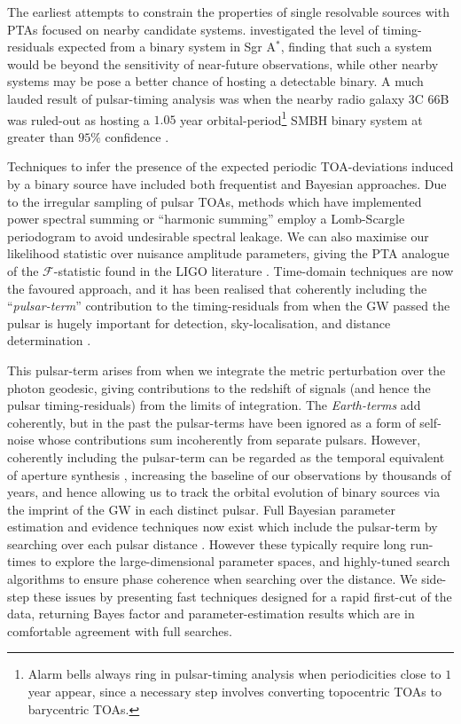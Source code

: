 \documentclass[twocolappendix,tighten]{emulateapj}
\begin{document}
The earliest attempts to constrain the properties of single resolvable sources with PTAs focused on nearby candidate systems. \citet{lommenbacker2001} investigated the level of timing-residuals expected from a binary system in Sgr A$^*$, finding that such a system would be beyond the sensitivity of near-future observations, while other nearby systems may be pose a better chance of hosting a detectable binary. A much lauded result of pulsar-timing analysis was when the nearby radio galaxy 3C 66B was ruled-out as hosting a $1.05$ year orbital-period\footnote{Alarm bells always ring in pulsar-timing analysis when periodicities close to $1$ year appear, since a necessary step involves converting topocentric TOAs to barycentric TOAs.} SMBH binary system at greater than $95\%$ confidence \citep{jenet2004_3C66B}.

Techniques to infer the presence of the expected periodic TOA-deviations induced by a binary source have included both frequentist and Bayesian approaches. Due to the irregular sampling of pulsar TOAs, methods which have implemented power spectral summing \citep{yardley-2010} or ``harmonic summing'' \citep{jenet2004_3C66B} employ a Lomb-Scargle periodogram to avoid undesirable spectral leakage. We can also maximise our likelihood statistic over nuisance amplitude parameters, giving the PTA analogue of the $\mathcal{F}$-statistic found in the LIGO literature \citep{babak-sesana-2012,ellisoptimal2012}. Time-domain techniques are now the favoured approach, and it has been realised that coherently including the ``{\it pulsar-term}'' contribution to the timing-residuals from when the GW passed the pulsar is hugely important for detection, sky-localisation, and distance determination \citep{corbin-cornish-2010,lee-wex-2011}. 

This pulsar-term arises from when we integrate the metric perturbation over the photon geodesic, giving contributions to the redshift of signals (and hence the pulsar timing-residuals) from the limits of integration. The {\it Earth-terms} add coherently, but in the past the pulsar-terms have been ignored as a form of self-noise whose contributions sum incoherently from separate pulsars. However, coherently including the pulsar-term can be regarded as the temporal equivalent of aperture synthesis \citep{corbin-cornish-2010}, increasing the baseline of our observations by thousands of years, and hence allowing us to track the orbital evolution of binary sources via the imprint of the GW in each distinct pulsar. Full Bayesian parameter estimation and evidence techniques now exist which include the pulsar-term by searching over each pulsar distance \citep{ellisbayesian2013}. However these typically require long run-times to explore the large-dimensional parameter spaces, and highly-tuned search algorithms to ensure phase coherence when searching over the distance. We side-step these issues by presenting fast techniques designed for a rapid first-cut of the data, returning Bayes factor and parameter-estimation results which are in comfortable agreement with full searches.
\end{document}
